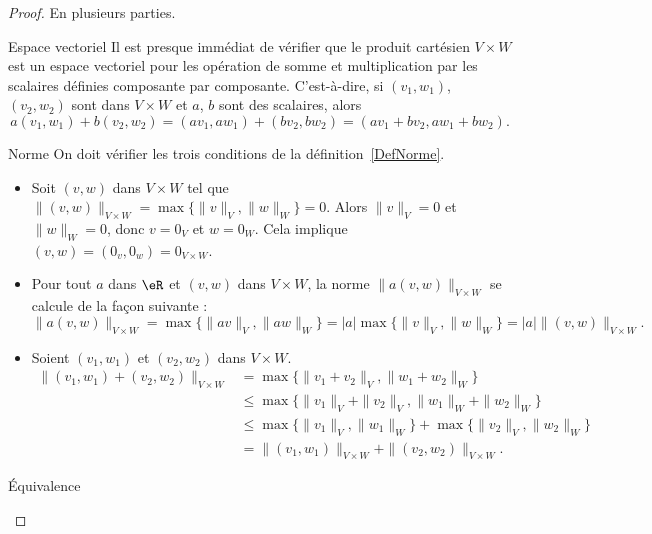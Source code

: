 \begin{proof}
    En plusieurs parties.
    \begin{subproof}
        \item[Espace vectoriel]
                Il est presque immédiat de vérifier que le produit cartésien $V\times W$ est un espace vectoriel pour les opération de somme et multiplication par les scalaires définies composante par composante. C'est-à-dire,  si $(v_1,w_1)$, $(v_2,w_2)$ sont dans $V\times W$ et $a$, $b$ sont des scalaires, alors
                \begin{equation}
                    a (v_1,w_1)+ b(v_2,w_2)=(av_1,aw_1)+ (bv_2,bw_2)=(av_1+bv_2,aw_1+bw_2).
                \end{equation}

            \item[Norme]
                On doit vérifier les trois conditions de la définition~\ref{DefNorme}.
                \begin{itemize}
                    \item Soit $(v,w)$ dans $V\times W$ tel que $\|(v,w)\|_{V\times W}=\max\{\|v\|_{V},\|w\|_W\}=0$. Alors $\|v\|_V=0$ et $\|w\|_W=0$, donc $v=0_V$ et $w=0_W$. Cela implique $(v,w)=(0_v,0_w)=0_{V\times W}$.
                    \item Pour tout $a$ dans $\eR$ et $(v,w)$ dans $V\times W$, la norme $\|a (v,w)\|_{V\times W}$ se calcule de la façon suivante :
                        \begin{equation}
                            \|a (v,w)\|_{V\times W}= \max\{ \| av \|_V,\| aw \|_W \} =|a|\max\{\|v\|_{V},\|w\|_W\}=|a|\|(v,w)\|_{V\times W}.
                        \end{equation}
                    \item Soient $(v_1,w_1)$ et $(v_2,w_2)$ dans $V\times W$.
                    \begin{equation}
                        \begin{aligned}
                            \|(v_1,w_1)+(v_2,w_2)\|_{V\times W}&=\max\{\|v_1+v_2\|_{V},\|w_1+w_2\|_W\}\\
                            &\leq \max\{\|v_1\|_V+\|v_2\|_{V},\|w_1\|_W+\|w_2\|_W\}\\
                            &\leq\max\{\|v_1\|_V,\|w_1\|_W\}+ \max\{\|v_2\|_{V},\|w_2\|_W\}\\
                            &=\|(v_1,w_1)\|_{V\times W}+\|(v_2,w_2)\|_{V\times W}.
                        \end{aligned}
                    \end{equation}
                \end{itemize}
            \item[Équivalence]


\end{subproof}
\end{proof}
